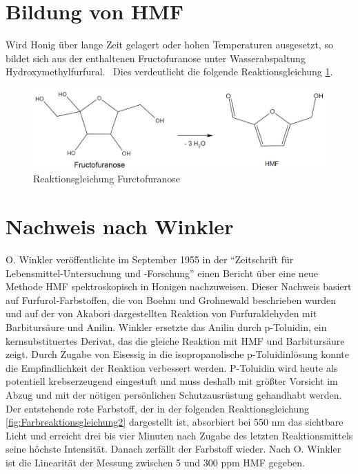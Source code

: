\section{Bildung von HMF}

Wird Honig über lange Zeit gelagert oder hohen Temperaturen ausgesetzt, so bildet sich aus der enthaltenen Fructofuranose unter Wasserabspaltung Hydroxymethylfurfural.~\cite{HMF} Dies verdeutlicht die folgende Reaktionsgleichung \ref{fig:HMFEntstehung}. 
  
\begin{figure}[htbp]
	\centering
		\includegraphics[width=1.00\textwidth]{../Bilder/HMFEntstehung.JPG}
	\caption{Reaktionsgleichung Furctofuranose}
	\label{fig:HMFEntstehung}
\end{figure}

\section{Nachweis nach Winkler}

O. Winkler veröffentlichte im September 1955 in der ``Zeitschrift für Lebensmittel-Untersuchung und -Forschung'' einen Bericht über eine neue Methode HMF spektroskopisch in Honigen nachzuweisen. Dieser Nachweis basiert auf Furfurol-Farbstoffen, die von Boehm und Grohnewald beschrieben wurden und auf der von Akabori dargestellten Reaktion von Furfuraldehyden mit Barbitursäure und Anilin. Winkler ersetzte das Anilin durch p-Toluidin, ein kernsubstituertes Derivat, das die gleiche Reaktion mit HMF und Barbitursäure zeigt. Durch Zugabe von Eisessig in die isopropanolische p-Toluidinlösung konnte die Empfindlichkeit der Reaktion verbessert werden. P-Toluidin wird heute als potentiell krebserzeugend eingestuft und muss deshalb mit größter Vorsicht im Abzug und mit der nötigen persönlichen Schutzausrüstung gehandhabt werden.\\
Der entstehende rote Farbstoff, der in der folgenden Reaktionsgleichung \ref{fig:Farbreaktionsgleichung2} dargestellt ist, absorbiert bei 550 nm das sichtbare Licht und erreicht drei bis vier Minuten nach Zugabe des letzten Reaktionsmittels seine höchste Intensität. Danach zerfällt der Farbstoff wieder. Nach O. Winkler ist die Linearität der Messung zwischen 5 und 300 ppm HMF gegeben.~\cite{Winkler}

